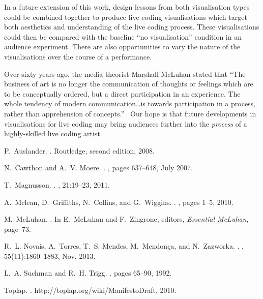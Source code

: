 \documentclass{sig-alternate}
\begin{document}
In a future extension of this work, design lessons from both
visualisation types could be combined together to produce live coding
visualisations which target both aesthetics and understanding of the
live coding process. These visualisations could then be compared with
the baseline ``no visualisation'' condition in an audience experiment.
There are also opportunities to vary the nature of the visualisations
over the course of a performance.

Over sixty years ago, the media theorist Marshall McLuhan stated that
``The business of art is no longer the communication of thoughts or
feelings which are to be conceptually ordered, but a direct
participation in an experience. The whole tendency of modern
communication\ldots is towards participation in a process, rather than
apprehension of concepts.''~\cite{McLuhan} Our hope is that future
developments in visualisations for live coding may bring audiences
further into the \emph{process} of a highly-skilled live coding
artist.



\begin{thebibliography}{1}

P.~Auslander.
.
\newblock Routledge, second edition, 2008.

N.~Cawthon and A.~V. Moere.
.
, pages 637--648, July 2007.

T.~Magnusson.
.
, 21:19--23, 2011.

A.~Mclean, D.~Griffiths, N.~Collins, and G.~Wiggins.
.
, pages 1--5, 2010.

M.~McLuhan.
.
\newblock In E.~McLuhan and F.~Zingrone, editors, {\em Essential McLuhan},
  page~73.

R.~L. Novais, A.~Torres, T.~S. Mendes, M.~Mendon\c{c}a, and N.~Zazworka.
.
, 55(11):1860--1883, Nov.
  2013.

L.~A. Suchman and R.~H. Trigg.
.
\newblock pages 65--90, 1992.

Toplap.
.
\newblock http://toplap.org/wiki/ManifestoDraft, 2010.

\end{thebibliography}
\end{document}
